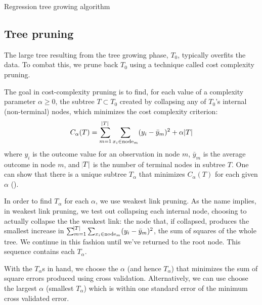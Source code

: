 \documentclass[12pt]{article}
\begin{document}
\begin{algorithm}[!htbp]
 \caption{Regression tree growing algorithm}
\end{algorithm}


\subsection{Tree pruning} %
\label{sub:tree_pruning}

The large tree resulting from the tree growing phase, $T_{0}$, typically overfits the data. To combat this, we prune back $T_{0}$ using a technique called cost complexity pruning.

The goal in cost-complexity pruning is to find, for each value of a complexity parameter $\alpha \geq 0$, the subtree $T \subset T_{0}$ created by collapsing any of $T_{0}$'s internal (non-terminal) nodes, which minimizes the cost complexity criterion:
%
\begin{equation}
    C_{\alpha}(T) = \sum_{m = 1}^{\abs{T}} \sum_{x_{i} \in \text{node}_{m}} (y_{i} - \bar{y}_{m})^2 + \alpha \abs{T}
\end{equation}
%
where $y_{i}$ is the outcome value for an observation in node $m$, $\bar{y}_{m}$ is the average outcome in node $m$, and $\abs{T}$ is the number of terminal nodes in subtree $T$. One can show that there is a unique subtree $T_{\alpha}$ that minimizes $C_{\alpha}(T)$ for each given $\alpha$ (\cite{esl}).

In order to find $T_{\alpha}$ for each $\alpha$, we use weakest link pruning. As the name implies, in weakest link pruning, we test out collapsing each internal node, choosing to actually collapse the the weakest link: the node that, if collapsed, produces the smallest increase in $\sum_{m = 1}^{\abs{T}} \sum_{x_{i} \in \text{node}_{m}} (y_{i} - \bar{y}_{m})^2$, the sum of squares of the whole tree. We continue in this fashion until we've returned to the root node. This sequence contains each $T_{\alpha}$.

With the $T_{\alpha}$s in hand, we choose the $\alpha$ (and hence $T_{\alpha}$) that minimizes the sum of square errors produced using cross validation. Alternatively, we can use choose the largest $\alpha$ (smallest $T_{\alpha}$) which is within one standard error of the minimum cross validated error.
\end{document}
